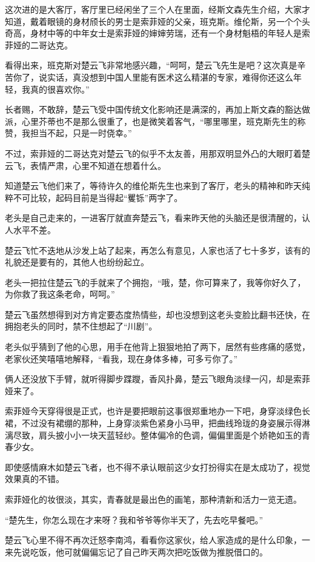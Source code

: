 这次进的是大客厅，客厅里已经闲坐了三个人在里面，经斯文森先生介绍，大家才知道，戴着眼镜的身材颀长的男士是索菲娅的父亲，班克斯。维伦斯，另一个个头奇高，身材中等的中年女士是索菲娅的婶婶劳瑞，还有一个身材魁梧的年轻人是索菲娅的二哥达克。

看得出来，班克斯对楚云飞非常地感兴趣，“呵呵，楚云飞先生是吧？这次真是辛苦你了，说实话，真没想到中国人里能有医术这么精湛的专家，难得你还这么年轻，我真的很喜欢你。”

长者赐，不敢辞，楚云飞受中国传统文化影响还是满深的，再加上斯文森的豁达做派，心里芥蒂也不是那么很重了，也是微笑着客气，“哪里哪里，班克斯先生的称赞，我担当不起，只是一时侥幸。”

不过，索菲娅的二哥达克对楚云飞的似乎不太友善，用那双明显外凸的大眼盯着楚云飞，表情严肃，心里不知道在想着什么。

知道楚云飞他们来了，等待许久的维伦斯先生也来到了客厅，老头的精神和昨天纯粹不可比较，起码目前是当得起“矍铄”两字了。

老头是自己走来的，一进客厅就直奔楚云飞，看来昨天他的头脑还是很清醒的，认人水平不差。

楚云飞忙不迭地从沙发上站了起来，再怎么有意见，人家也活了七十多岁，该有的礼貌还是要有的，其他人也纷纷起立。

老头一把拉住楚云飞的手就来了个拥抱，“哦，楚，你可算来了，我等你好久了，为你救了我这条老命，呵呵。”

楚云飞虽然想得到对方肯定要态度热情些，却也没想到这老头变脸比翻书还快，在拥抱老头的同时，禁不住想起了“川剧”。

老头似乎猜到了他的心思，用手在他背上狠狠地拍了两下，居然有些疼痛的感觉，老家伙还笑嘻嘻地解释，“看我，现在身体多棒，可多亏你了。”

俩人还没放下手臂，就听得脚步蹀躞，香风扑鼻，楚云飞眼角淡绿一闪，却是索菲娅来了。

索菲娅今天穿得很是正式，也许是要把眼前这事很郑重地办一下吧，身穿淡绿色长裙，不过没有裙绷的那种，上身穿淡紫色紧身小马甲，把曲线玲珑的身姿展示得淋漓尽致，肩头披小小一块天蓝轻纱。整体偏冷的色调，偏偏里面是个娇艳如玉的青春少女。

即使感情麻木如楚云飞者，也不得不承认眼前这少女打扮得实在是太成功了，视觉效果真的不错。

索菲娅化的妆很淡，其实，青春就是最出色的画笔，那种清新和活力一览无遗。

“楚先生，你怎么现在才来呀？我和爷爷等你半天了，先去吃早餐吧。”

楚云飞心里不得不再次迁怒李南鸿，看看你这家伙，给人家造成的是什么印象，一来先说吃饭，他可就偏偏忘记了自己昨天两次把吃饭做为推脱借口的。

